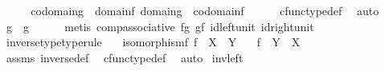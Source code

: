 \begin{isabellebody}
\ \ \isamarkupfalse%
\ \isamarkupfalse%
\ {\isachardoublequoteopen}codomain{\isacharparenleft}{\kern0pt}g{}{\isacharparenright}{\kern0pt}\ {\isacharequal}{\kern0pt}\ domain{\isacharparenleft}{\kern0pt}f{\isacharparenright}{\kern0pt}{\isachardoublequoteclose}\ {\isachardoublequoteopen}domain{\isacharparenleft}{\kern0pt}g{}{\isacharparenright}{\kern0pt}\ {\isacharequal}{\kern0pt}\ codomain{\isacharparenleft}{\kern0pt}f{\isacharparenright}{\kern0pt}{\isachardoublequoteclose}\isanewline
\ \ \ \ \isamarkupfalse%
\ cfunc{\isacharunderscore}{\kern0pt}type{\isacharunderscore}{\kern0pt}def\ \isamarkupfalse%
\ auto\isanewline
\ \ \isamarkupfalse%
\ \isamarkupfalse%
\ {\isachardoublequoteopen}g{}\ {\isacharequal}{\kern0pt}\ g{}{\isachardoublequoteclose}\isanewline
\ \ \ \ \isamarkupfalse%
\ {\isacharparenleft}{\kern0pt}metis\ comp{\isacharunderscore}{\kern0pt}associative\ f{\isacharunderscore}{\kern0pt}g{}\ g{}{\isacharunderscore}{\kern0pt}f\ id{\isacharunderscore}{\kern0pt}left{\isacharunderscore}{\kern0pt}unit\ id{\isacharunderscore}{\kern0pt}right{\isacharunderscore}{\kern0pt}unit{\isacharparenright}{\kern0pt}\isanewline
{}\isamarkupfalse%
%
\endisatagproof
{\isafoldproof}%
%
\isadelimproof
\isanewline
%
\endisadelimproof
\isanewline
{}\isamarkupfalse%
\ inverse{\isacharunderscore}{\kern0pt}type{\isacharbrackleft}{\kern0pt}type{\isacharunderscore}{\kern0pt}rule{\isacharbrackright}{\kern0pt}{\isacharcolon}{\kern0pt}\isanewline
\ \ \ {\isachardoublequoteopen}isomorphism{\isacharparenleft}{\kern0pt}f{\isacharparenright}{\kern0pt}{\isachardoublequoteclose}\ {\isachardoublequoteopen}f\ {\isacharcolon}{\kern0pt}\ X\ {\isasymrightarrow}\ Y{\isachardoublequoteclose}\isanewline
\ \ \ {\isachardoublequoteopen}f\isactrlbold {\isasyminverse}\ {\isacharcolon}{\kern0pt}\ Y\ {\isasymrightarrow}\ X{\isachardoublequoteclose}\isanewline
%
\isadelimproof
\ \ %
\endisadelimproof
%
\isatagproof
{}\isamarkupfalse%
\ assms\ inverse{\isacharunderscore}{\kern0pt}def{}\ \isamarkupfalse%
\ cfunc{\isacharunderscore}{\kern0pt}type{\isacharunderscore}{\kern0pt}def\ \isamarkupfalse%
\ auto%
\endisatagproof
{\isafoldproof}%
%
\isadelimproof
\isanewline
%
\endisadelimproof
\isanewline
{}\isamarkupfalse%
\ inv{\isacharunderscore}{\kern0pt}left{\isacharcolon}{\kern0pt}\isanewline

\end{isabellebody}
